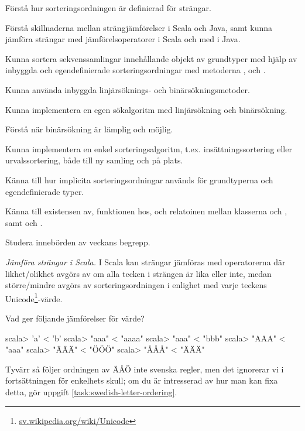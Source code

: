 

\Exercise{\ExeWeekTEN}

\begin{Goals}
\item Förstå hur sorteringsordningen är definierad för strängar.
\item Förstå skillnaderna mellan strängjämförelser i Scala och Java, samt kunna jämföra strängar med jämförelsoperatorer i Scala och med  i Java.
\item Kunna sortera sekvenssamlingar innehållande objekt av grundtyper med hjälp av inbyggda och egendefinierade sorteringsordningar med metoderna ,  och .
\item Kunna använda inbyggda linjärsöknings- och binärsökningsmetoder. 
\item Kunna implementera en egen sökalgoritm med linjärsökning och binärsökning.
\item Förstå när binärsökning är lämplig och möjlig.
\item Kunna implementera en enkel sorteringsalgoritm, t.ex. insättningssortering eller urvalssortering, både till ny samling och på plats.   
\item Känna till hur implicita sorteringsordningar används för grundtyperna och egendefinierade typer.
\item Känna till existensen av, funktionen hos, och relatoinen mellan klasserna  och , samt   och .
\end{Goals}

\begin{Preparations}
\item Studera innebörden av veckans begrepp. 
\end{Preparations}

\BasicTasks %

\Task \label{task:string-order-operators}\emph{Jämföra strängar i Scala.} I Scala kan strängar jämföras med operatorerna \code{== != < <= > >= }  där likhet/olikhet avgörs av om alla tecken i strängen är lika eller inte, medan större/mindre avgörs av sorteringsordningen i enlighet med varje teckens Unicode\footnote{\href{https://sv.wikipedia.org/wiki/Unicode}{sv.wikipedia.org/wiki/Unicode}}-värde. 

\Subtask Vad ger följande jämförelser för värde?
\begin{REPL}
scala> 'a' < 'b'
scala> "aaa" < "aaaa"
scala> "aaa" < "bbb"
scala> "AAA" < "aaa"
scala> "ÄÄÄ" < "ÖÖÖ"
scala> "ÅÅÅ" < "ÄÄÄ"
\end{REPL}
Tyvärr så följer ordningen av ÄÅÖ inte svenska regler, men det ignorerar vi i fortsättningen för enkelhets skull; om du är intresserad av hur man kan fixa  detta, gör uppgift \ref{task:swedish-letter-ordering}. 

